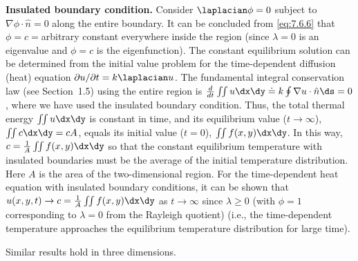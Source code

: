 \textbf{Insulated boundary condition.}  Consider $\laplacian\phi = 0$ subject to $\nabla\phi\cdot\hat{n} = 0$ along the entire boundary.  It can be concluded from \eqref{eq:7.6.6} that $\phi = c ={}$arbitrary constant everywhere inside the region (since $\lambda = 0$ is an eigenvalue and $\phi = c$ is the eigenfunction).  The constant equilibrium solution can be determined from the initial value problem for the time-dependent diffusion (heat) equation $\partial u/\partial t = k\laplacian u$.  The fundamental integral conservation law (see Section~1.5) using the entire region is $\frac{d}{dt}\iint u\dx\dy \doteq k\oint\nabla u\cdot\hat{n}\ds = 0$, where we have used the insulated boundary condition.  Thus, the total thermal energy $\iint u\dx\dy$ is constant in time, and its equilibrium value ($t \to \infty$), $\iint c\dx\dy = cA$, equals its initial value ($t = 0$), $\iint f(x,y)\dx\dy$.  In this way, $c = \frac{1}{A}\iint f(x,y)\dx\dy$ so that the constant equilibrium temperature with insulated boundaries must be the average of the initial temperature distribution.  Here $A$ is the area of the two-dimensional region.  For the time-dependent heat equation with insulated boundary conditions, it can be shown that $u(x,y,t) \to c = \frac{1}{A}\iint f(x,y)\dx\dy$ as $t \to \infty$ since $\lambda \geq 0$ (with $\phi = 1$ corresponding to $\lambda = 0$ from the Rayleigh quotient) (i.e., the time-dependent temperature approaches the equilibrium temperature distribution for large time).

Similar results hold in three dimensions.

